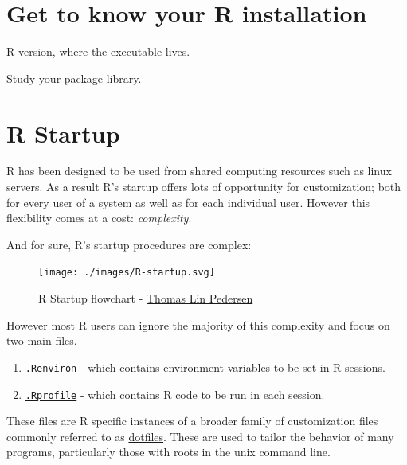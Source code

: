 \documentclass[
  letterpaper,
]{book}
\providecommand{\tightlist}{%
  \setlength{\itemsep}{0pt}\setlength{\parskip}{0pt}}\usepackage{longtable,booktabs,array}
\begin{document}
\hypertarget{get-to-know-your-r-installation}{%
\chapter*{Get to know your R
installation}\label{get-to-know-your-r-installation}}

R version, where the executable lives.

Study your package library.

\hypertarget{r-startup}{%
\chapter{R Startup}\label{r-startup}}

R has been designed to be used from shared computing resources such as
linux servers. As a result R's startup offers lots of opportunity for
customization; both for every user of a system as well as for each
individual user. However this flexibility comes at a cost:
\emph{complexity}.

And for sure, R's startup procedures are complex:

\begin{figure}

{\centering \texttt{[image: ./images/R-startup.svg]}

}

\caption{R Startup flowchart -
\href{https://twitter.com/thomasp85/status/961553618196418560}{Thomas
Lin Pedersen}}

\end{figure}

However most R users can ignore the majority of this complexity and
focus on two main files.

\begin{enumerate}
\def\labelenumi{\arabic{enumi}.}
\tightlist
\item
  \protect\hyperlink{renviron}{\texttt{.Renviron}} - which contains
  environment variables to be set in R sessions.
\item
  \protect\hyperlink{rprofile}{\texttt{.Rprofile}} - which contains R
  code to be run in each session.
\end{enumerate}

These files are R specific instances of a broader family of
customization files commonly referred to as
\href{https://www.quora.com/What-are-dotfiles}{dotfiles}. These are used
to tailor the behavior of many programs, particularly those with roots
in the unix command line.
\end{document}
